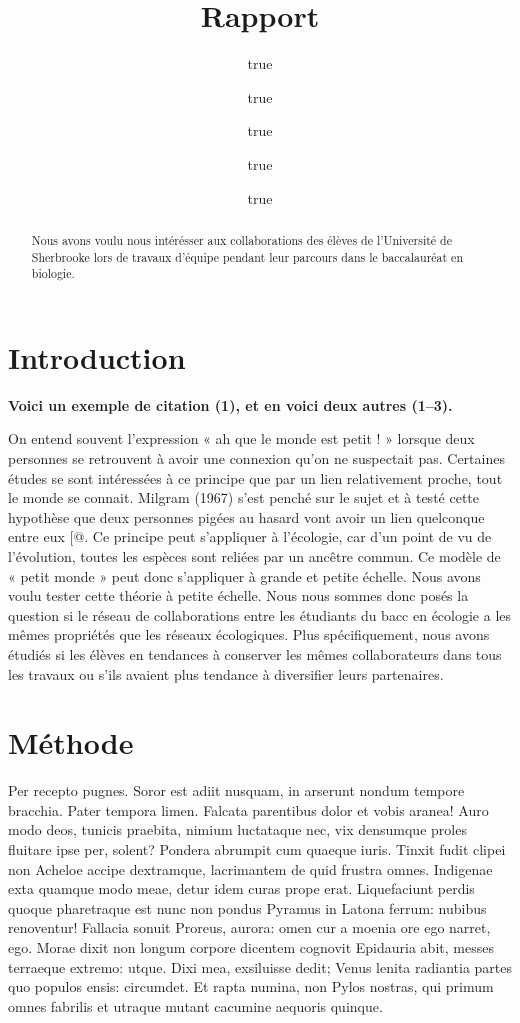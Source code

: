 \documentclass[
]{article}
\title{Rapport}
\author{true \and true \and true \and true \and true}
\date{}
\begin{document}
\maketitle
\begin{abstract}
Nous avons voulu nous intérésser aux collaborations des élèves de
l'Université de Sherbrooke lors de travaux d'équipe pendant leur
parcours dans le baccalauréat en biologie.
\end{abstract}

\hypertarget{introduction}{%
\section{Introduction}\label{introduction}}

\textbf{Voici un exemple de citation (1), et en voici deux autres
(1--3).}

On entend souvent l'expression « ah que le monde est petit ! » lorsque
deux personnes se retrouvent à avoir une connexion qu'on ne suspectait
pas. Certaines études se sont intéressées à ce principe que par un lien
relativement proche, tout le monde se connait. Milgram (1967) s'est
penché sur le sujet et à testé cette hypothèse que deux personnes pigées
au hasard vont avoir un lien quelconque entre eux {[}@. Ce principe peut
s'appliquer à l'écologie, car d'un point de vu de l'évolution, toutes
les espèces sont reliées par un ancêtre commun. Ce modèle de « petit
monde » peut donc s'appliquer à grande et petite échelle. Nous avons
voulu tester cette théorie à petite échelle. Nous nous sommes donc posés
la question si le réseau de collaborations entre les étudiants du bacc
en écologie a les mêmes propriétés que les réseaux écologiques. Plus
spécifiquement, nous avons étudiés si les élèves en tendances à
conserver les mêmes collaborateurs dans tous les travaux ou s'ils
avaient plus tendance à diversifier leurs partenaires.

\hypertarget{muxe9thode}{%
\section{Méthode}\label{muxe9thode}}

Per recepto pugnes. Soror est adiit nusquam, in arserunt nondum tempore
bracchia. Pater tempora limen. Falcata parentibus dolor et vobis aranea!
Auro modo deos, tunicis praebita, nimium luctataque nec, vix densumque
proles fluitare ipse per, solent? Pondera abrumpit cum quaeque iuris.
Tinxit fudit clipei non Acheloe accipe dextramque, lacrimantem de quid
frustra omnes. Indigenae exta quamque modo meae, detur idem curas prope
erat. Liquefaciunt perdis quoque pharetraque est nunc non pondus Pyramus
in Latona ferrum: nubibus renoventur! Fallacia sonuit Proreus, aurora:
omen cur a moenia ore ego narret, ego. Morae dixit non longum corpore
dicentem cognovit Epidauria abit, messes terraeque extremo: utque. Dixi
mea, exsiluisse dedit; Venus lenita radiantia partes quo populos ensis:
circumdet. Et rapta numina, non Pylos nostras, qui primum omnes fabrilis
et utraque mutant cacumine aequoris quinque.
\end{document}
